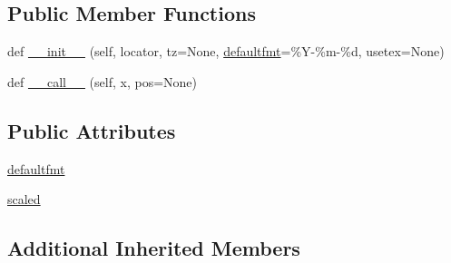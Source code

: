 \subsection*{Public Member Functions}
\begin{DoxyCompactItemize}
\item 
def \hyperlink{classmatplotlib_1_1dates_1_1AutoDateFormatter_a856f8f1e4e7c693991d56cc41313ce47}{\+\_\+\+\_\+init\+\_\+\+\_\+} (self, locator, tz=None, \hyperlink{classmatplotlib_1_1dates_1_1AutoDateFormatter_ad40ac85744ef9124ff81debf8a41b191}{defaultfmt}=\textquotesingle{}\%Y-\/\%m-\/\%d\textquotesingle{}, usetex=None)
\item 
def \hyperlink{classmatplotlib_1_1dates_1_1AutoDateFormatter_a8f033a6cb87d8c33bd7224ea9901a632}{\+\_\+\+\_\+call\+\_\+\+\_\+} (self, x, pos=None)
\end{DoxyCompactItemize}
\subsection*{Public Attributes}
\begin{DoxyCompactItemize}
\item 
\hyperlink{classmatplotlib_1_1dates_1_1AutoDateFormatter_ad40ac85744ef9124ff81debf8a41b191}{defaultfmt}
\item 
\hyperlink{classmatplotlib_1_1dates_1_1AutoDateFormatter_a7c8150a94f4782c409698d595d9825e3}{scaled}
\end{DoxyCompactItemize}
\subsection*{Additional Inherited Members}


